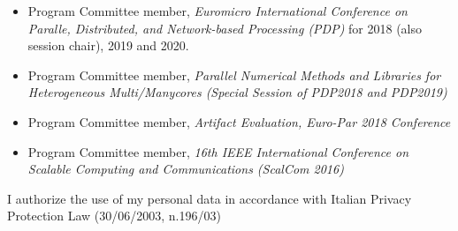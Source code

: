 \documentclass[10pt,a4paper]{altacv}
\begin{document}
\begin{itemize}
\item Program Committee member, \textit{Euromicro International Conference on Paralle, Distributed, and Network-based Processing (PDP)} for 2018 (also session chair), 2019 and 2020.
\item Program Committee member, \textit{Parallel Numerical Methods and Libraries for Heterogeneous Multi/Manycores (Special Session of PDP2018 and PDP2019)}
\item Program Committee member, \textit{Artifact Evaluation, Euro-Par 2018 Conference}
\item Program Committee member, \textit{16th IEEE International Conference on Scalable Computing and Communications (ScalCom 2016)}
\end{itemize}

\divider

{\color{gray} \small I authorize the use of my personal data in accordance with Italian Privacy Protection Law (30/06/2003, n.196/03)}
\end{document}
